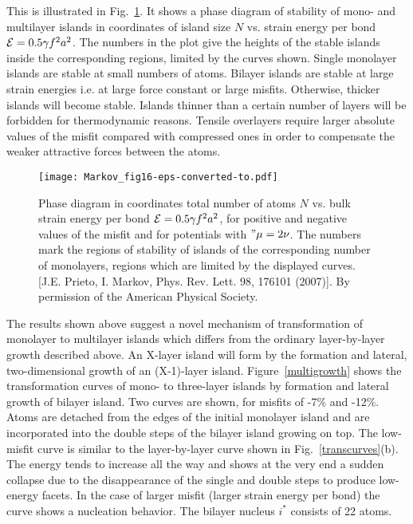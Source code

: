 \documentclass[aps,prl,showpacs,twocolumn,byrevtex,floatfix]{revtex4-1}
\begin{document}
This is illustrated in Fig.\ \ref{phasedia}. It shows a phase diagram
of stability of mono- and multilayer islands in coordinates of island size $N$
vs. strain energy per bond ${\cal E} = 0.5\gamma f^2 a^2$. The numbers in 
the plot give the heights of the stable islands inside the corresponding 
regions, limited by the curves shown. Single monolayer
islands are stable at small numbers of atoms. Bilayer islands are stable at
large strain energies i.e. at large force constant or large misfits. Otherwise,
thicker islands will become stable. Islands thinner than a certain number
of layers will be forbidden for thermodynamic reasons. Tensile overlayers
require larger absolute values of the misfit compared with compressed ones
in order to compensate the weaker attractive forces between the atoms.

\begin{figure}[htb]
\texttt{[image: Markov\_fig16-eps-converted-to.pdf]}
\caption{\label{phasedia} Phase diagram in coordinates total number of 
atoms $N$ vs. bulk strain energy per bond ${\cal E} = 0.5\gamma f^2 a^2$, 
for positive and negative values of the misfit and for potentials with 
$"\mu = 2\nu$. The numbers mark the regions of stability of islands of the
corresponding number of monolayers, regions which are limited by the displayed 
curves. [J.E. Prieto, I. Markov, Phys. Rev. Lett. 98, 176101 (2007)]. 
By permission of the American Physical Society.}
\end{figure}

The results shown above suggest a novel mechanism of transformation of
monolayer to multilayer islands which differs from the ordinary layer-by-layer
growth described above. An X-layer island will form by the formation and 
lateral, two-dimensional growth of an (X-1)-layer island. 
Figure\ \ref{multigrowth} shows
the transformation curves of mono- to three-layer islands by formation and
lateral growth of bilayer island. Two curves are shown, for misfits of -7\% and
-12\%. Atoms are detached from the edges of the initial monolayer island and are
incorporated into the double steps of the bilayer island growing on top. The
low-misfit curve is similar to the layer-by-layer curve shown in Fig.\
\ref{transcurves}(b). The energy tends to increase all the way and shows at the
very end a sudden collapse due to the disappearance of the single and double
steps to produce low-energy facets. In the case of larger misfit (larger
strain energy per bond) the curve shows a nucleation behavior. The bilayer
nucleus $i^*$ consists of 22 atoms.
\end{document}
